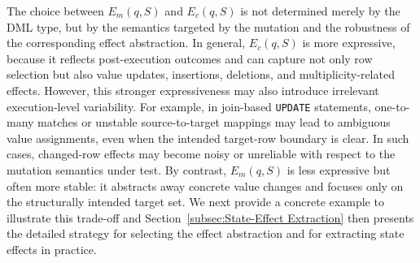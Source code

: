 The choice between $E_m(q,S)$ and $E_c(q,S)$ is not determined merely by the DML type, but by the semantics targeted by the mutation and the robustness of the corresponding effect abstraction. 
In general, $E_c(q,S)$ is more expressive, because it reflects post-execution outcomes and can capture not only row selection but also value updates, insertions, deletions, and multiplicity-related effects. 
However, this stronger expressiveness may also introduce irrelevant execution-level variability. 
For example, in join-based \texttt{UPDATE} statements, one-to-many matches or unstable source-to-target mappings may lead to ambiguous value assignments, even when the intended target-row boundary is clear. 
In such cases, changed-row effects may become noisy or unreliable with respect to the mutation semantics under test. 
By contrast, $E_m(q,S)$ is less expressive but often more stable: it abstracts away concrete value changes and focuses only on the structurally intended target set. 
We next provide a concrete example to illustrate this trade-off and Section~\ref{subsec:State-Effect Extraction} then presents the detailed strategy for selecting the effect abstraction and for extracting state effects in practice.

